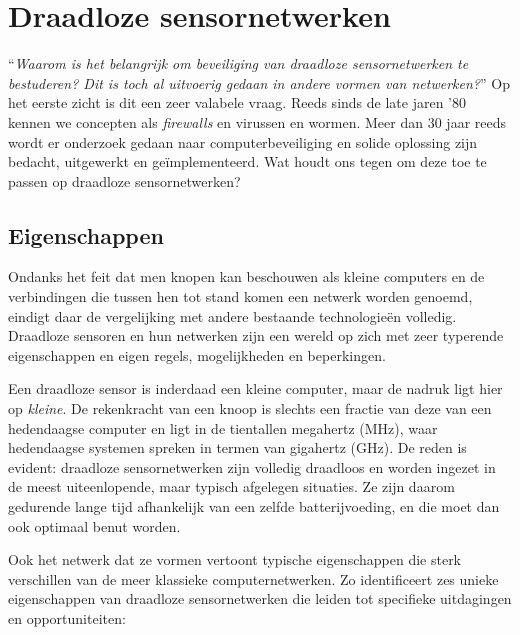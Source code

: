 
\section{Draadloze sensornetwerken}
\label{section:landscape}

``\emph{Waarom is het belangrijk om beveiliging van draadloze sensornetwerken
te bestuderen? Dit is toch al uitvoerig gedaan in andere vormen van
netwerken?}'' Op het eerste zicht is dit een zeer valabele vraag. Reeds sinds
de late jaren '80 kennen we concepten als \emph{firewalls} en virussen en
wormen. Meer dan 30 jaar reeds wordt er onderzoek gedaan naar
computerbeveiliging en solide oplossing zijn bedacht, uitgewerkt en
ge\"implementeerd. Wat houdt ons tegen om deze toe te passen op draadloze
sensornetwerken?

\subsection{Eigenschappen}

Ondanks het feit dat men knopen kan beschouwen als kleine computers en de
verbindingen die tussen hen tot stand komen een netwerk worden genoemd, eindigt
daar de vergelijking met andere bestaande technologie\"en volledig. Draadloze
sensoren en hun netwerken zijn een wereld op zich met zeer typerende
eigenschappen en eigen regels, mogelijkheden en beperkingen.

Een draadloze sensor is inderdaad een kleine computer, maar de nadruk ligt hier
op \emph{kleine}. De rekenkracht van een knoop is slechts een fractie van deze
van een hedendaagse computer en ligt in de tientallen megahertz (MHz), waar
hedendaagse systemen spreken in termen van gigahertz (GHz). De reden is
evident: draadloze sensornetwerken zijn volledig draadloos en worden ingezet in
de meest uiteenlopende, maar typisch afgelegen situaties. Ze zijn daarom
gedurende lange tijd afhankelijk van een zelfde batterijvoeding, en die moet
dan ook optimaal benut worden.

Ook het netwerk dat ze vormen vertoont typische eigenschappen die sterk
verschillen van de meer klassieke computernetwerken. Zo identificeert
\citep{blilat2012wireless} zes unieke eigenschappen van draadloze
sensornetwerken die leiden tot specifieke uitdagingen en opportuniteiten:

